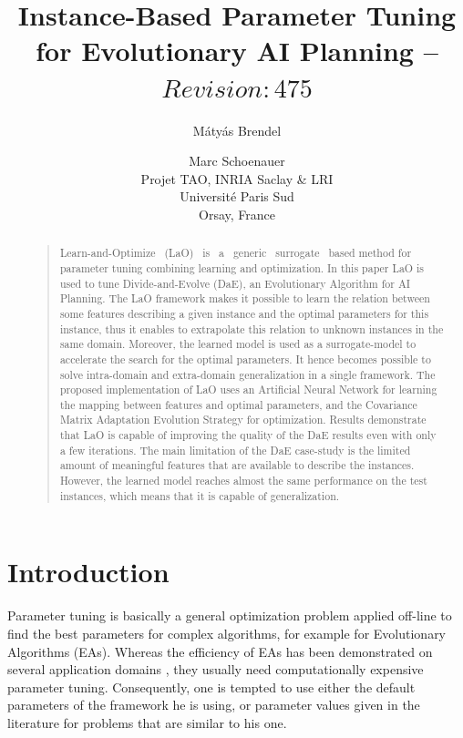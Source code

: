\documentclass[letterpaper]{article}
\title{Instance-Based Parameter Tuning\\
for Evolutionary AI Planning -- $ Revision: 475 $}
\author{M{\'a}ty{\'a}s Brendel  
\and Marc Schoenauer \\ 
Projet TAO, INRIA Saclay \& LRI\\
Universit{\'e} Paris Sud\\
Orsay, France}
\begin{document}
\maketitle


\begin{abstract} \begin{quote}
Learn-and-Optimize ~(LaO) ~is ~a ~generic ~surrogate ~based method for parameter tuning combining learning and optimization. In this paper LaO is used to tune Divide-and-Evolve (DaE), an Evolutionary Algorithm for AI Planning. The LaO framework makes it possible to learn the relation between some features describing a given instance and the optimal parameters for this instance, thus it enables to extrapolate this relation to unknown instances in the same domain. Moreover, the learned model is used as a surrogate-model to accelerate the search for the optimal parameters. It hence becomes possible to solve intra-domain and extra-domain generalization in a single framework. The proposed implementation of LaO uses an Artificial Neural Network for learning the mapping between features and optimal parameters, and the Covariance Matrix Adaptation Evolution Strategy for optimization. Results demonstrate that LaO is capable of improving the quality of the DaE results even with only a few iterations. The main limitation of the DaE case-study is the limited amount of meaningful features that are available to describe the instances. However, the learned model reaches almost the same performance on the test instances, which means that it is capable of generalization. 
\end{quote}
\end{abstract}



\section{Introduction}

Parameter tuning is basically a general optimization problem applied off-line to find the best parameters for complex algorithms, for example for Evolutionary Algorithms (EAs). Whereas the efficiency of EAs has been demonstrated on several application domains \cite{practice08,ParameterSettingBook07}, they usually need computationally expensive parameter tuning. Consequently, one is tempted to use either the default parameters of the framework he is using, or parameter values given in the literature for problems that are similar to his one. 
\end{document}
